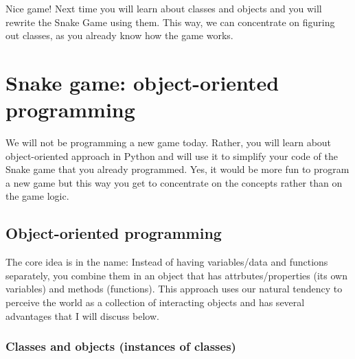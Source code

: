 \documentclass[
]{book}
\begin{document}
Nice game! Next time you will learn about classes and objects and you will rewrite the Snake Game using them. This way, we can concentrate on figuring out classes, as you already know how the game works.

\hypertarget{seminar-02-03}{%
\chapter{Snake game: object-oriented programming}\label{seminar-02-03}}

We will not be programming a new game today. Rather, you will learn about object-oriented approach in Python and will use it to simplify your code of the Snake game that you already programmed. Yes, it would be more fun to program a new game but this way you get to concentrate on the concepts rather than on the game logic.

\hypertarget{object-oriented-programming}{%
\section{Object-oriented programming}\label{object-oriented-programming}}

The core idea is in the name: Instead of having variables/data and functions separately, you combine them in an object that has attrbutes/properties (its own variables) and methods (functions). This approach uses our natural tendency to perceive the world as a collection of interacting objects and has several advantages that I will discuss below.

\hypertarget{classes-and-objects-instances-of-classes}{%
\subsection{Classes and objects (instances of classes)}\label{classes-and-objects-instances-of-classes}}
\end{document}
